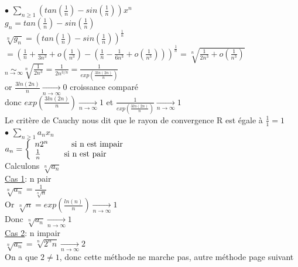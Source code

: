 \documentclass{article}
\newcommand\tab[1][1cm]{\hspace*{#1}}
\newcommand{\mylim}[2]{\underset{#1 \rightarrow #2}{\longrightarrow}}
\newcommand{\mysim}[2]{\underset{#1 \rightarrow #2}{\sim}}
\begin{document}
\newpage
\noindent $\bullet$ $\sum_{n \geq 1} (tan(\frac{1}{n}) - sin(\frac{1}{n})) x^n$\\
$g_n = tan(\frac{1}{n}) - sin(\frac{1}{n})$\\
$\sqrt[n]{g_n} = (tan(\frac{1}{n}) - sin(\frac{1}{n}))^\frac{1}{n}$\\
$= (\frac{1}{n} + \frac{1}{3n^3} + o(\frac{1}{n^3}) - (\frac{1}{n} - \frac{1}{6n^3} + o(\frac{1}{n^3})))^\frac{1}{n} = \sqrt[n]{\frac{1}{2n^3} + o(\frac{1}{n^3})}$\\
$\mysim{n}{\infty} \sqrt[n]{\frac{1}{2n^3}} = \frac{1}{2n^{3/n}} = \frac{1}{exp(\frac{3ln(2n)}{n})}$\\
or $\frac{3ln(2n)}{n} \mylim{n}{\infty} 0$ croissance comparé\\
donc $exp(\frac{3ln(2n)}{n}) \mylim{n}{\infty} 1$ et $\frac{1}{exp(\frac{3ln(2n)}{n})} \mylim{n}{\infty} 1$\\
Le critère de Cauchy nous dit que le rayon de convergence R est égale à $\frac{1}{1} = 1$\\
$\bullet$ $\sum_{n \geq 1} a_n x_n$\\
$a_n = \left\{
    \begin{array}{ll}
        n 2^n \tab \mbox{si n est impair}\\
        \frac{1}{n} \tab \mbox{si n est pair}\\
    \end{array}
\right.$\\
Calculons $\sqrt[n]{a_n}$\\
\underline{Cas 1}: n pair\\
$\sqrt[n]{a_n} = \frac{1}{\sqrt[n]{n}}$\\
Or $\sqrt[n]{n} = exp(\frac{ln(n)}{n}) \mylim{n}{\infty} 1$\\
Donc $\sqrt[n]{a_n} \mylim{n}{\infty} 1$\\
\underline{Cas 2}: n impair\\
$\sqrt[n]{a_n} = \sqrt[n]{2^n n} \mylim{n}{\infty} 2$\\
On a que $2 \neq 1$, donc cette méthode ne marche pas, autre méthode page suivant\\

\newpage
\end{document}
